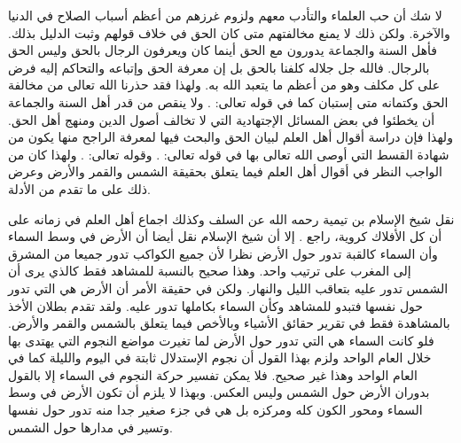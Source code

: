 لا شك أن حب العلماء والتأدب معهم ولزوم غرزهم من أعظم أسباب الصلاح في الدنيا والآخرة. ولكن ذلك لا يمنع مخالفتهم متى كان الحق في خلاف قولهم وثبت الدليل بذلك. فأهل السنة والجماعة يدورون مع الحق أينما كان ويعرفون الرجال بالحق وليس الحق بالرجال. فالله جل جلاله كلفنا بالحق بل إن معرفة الحق وإتباعه والتحاكم إليه فرض على كل مكلف وهو من أعظم ما يتعبد الله به. ولهذا فقد حذرنا الله تعالى من مخالفة الحق وكتمانه متى إستبان كما في قوله تعالى: \quranayah*[2][42]{\footnotesize (\surahname*[2])}. ولا ينقص من قدر أهل السنة والجماعة أن يخطئوا في بعض المسائل الإجتهادية التي لا تخالف أصول الدين ومنهج أهل الحق. ولهذا فإن دراسة أقوال أهل العلم لبيان الحق والبحث فيها لمعرفة الراجح منها يكون من شهادة القسط التي أوصى الله تعالى بها في قوله تعالى: 
\quranayah*[4][135]{\footnotesize (\surahname*[4])}. وقوله تعالى: \quranayah*[5][8]{\footnotesize (\surahname*[5])}. ولهذا كان من الواجب النظر في أقوال أهل العلم فيما يتعلق بحقيقة الشمس والقمر والأرض وعرض ذلك على ما تقدم من الأدلة.

نقل شيخ الإسلام بن تيمية رحمه الله عن السلف وكذلك اجماع أهل العلم في زمانه على أن كل الأفلاك كروية، راجع . إلا أن شيخ الإسلام نقل أيضا أن الأرض في وسط السماء وأن السماء كالقبة تدور حول الأرض نظرا لأن جميع الكواكب تدور جميعا من المشرق إلى المغرب على ترتيب واحد. وهذا صحيح بالنسبة للمشاهد فقط كالذي يرى أن الشمس تدور عليه بتعاقب الليل والنهار. ولكن في حقيقة الأمر أن الأرض هي التي تدور حول نفسها فتبدو للمشاهد وكأن السماء بكاملها تدور عليه. ولقد تقدم بطلان الأخذ بالمشاهدة فقط في تقرير حقائق الأشياء وبالأخص فيما يتعلق بالشمس والقمر والأرض. فلو كانت السماء هي التي تدور حول الأرض لما تغيرت مواضع النجوم التي يهتدى بها خلال العام الواحد ولزم بهذا القول أن نجوم الإستدلال ثابتة في اليوم والليلة كما في العام الواحد وهذا غير صحيح. فلا يمكن تفسير حركة النجوم في السماء إلا بالقول بدوران الأرض حول الشمس وليس العكس. وبهذا لا يلزم أن تكون الأرض في وسط السماء ومحور الكون كله ومركزه بل هي في جزء صغير جدا منه تدور حول نفسها وتسير في مدارها حول الشمس.

